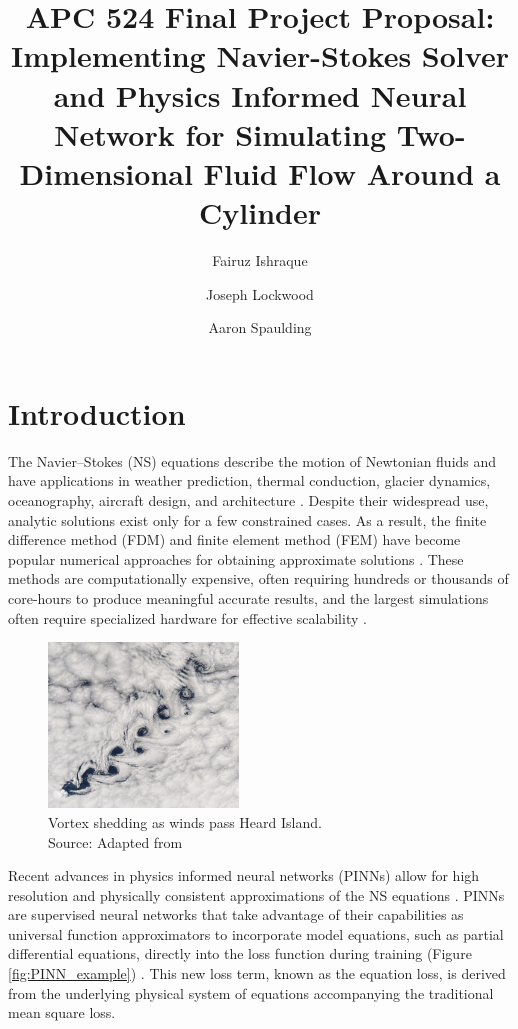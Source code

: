 \documentclass[11pt, letterpaper]{article}
\title{\titlefontlarge APC 524 Final Project Proposal:\\\titlefont Implementing Navier-Stokes Solver and Physics Informed Neural Network for Simulating Two-Dimensional Fluid Flow Around a Cylinder}
\author[1]{Fairuz Ishraque}
\author[1]{Joseph Lockwood}
\author[2]{Aaron Spaulding}
\affil[1]{Department of Geosciences}
\affil[2]{Department of Civil and Environmental Engineering}
\date{}
\begin{document}
\maketitle

\section*{Introduction}
The Navier–Stokes (NS) equations describe the motion of Newtonian fluids and have applications in weather prediction, thermal conduction, glacier dynamics, oceanography, aircraft design, and architecture \cite{chorin1968numerical}. Despite their widespread use, analytic solutions exist only for a few constrained cases. As a result, the finite difference method (FDM) and finite element method (FEM) have become popular numerical approaches for obtaining approximate solutions \cite{Whiteley2017}. These methods are computationally expensive, often requiring hundreds or thousands of core-hours to produce meaningful accurate results, and the largest simulations often require specialized hardware for effective scalability \cite{michalakes2007wrf}. 

\begin{figure}[!ht]
    \centering
    \includegraphics[width=0.45\textwidth]{Figures/Proposal/Heard_Island_Karman_vortex_street.jpg}
    \caption{Vortex shedding as winds pass Heard Island.\\Source: Adapted from \cite{team_english_2015}}
    \label{fig:vorticity}
\end{figure}

Recent advances in physics informed neural networks (PINNs) allow for high resolution and physically consistent approximations of the NS equations \cite{jin2021nsfnets} \cite{baymani2015artificial} \cite{eivazi2022physics}. PINNs are supervised neural networks that take advantage of their capabilities as universal function approximators to incorporate model equations, such as partial differential equations, directly into the loss function during training (Figure \ref{fig:PINN_example}) \cite{Raissi2019}. This new loss term, known as the equation loss, is derived from the underlying physical system of equations accompanying the traditional mean square loss.
\end{document}

